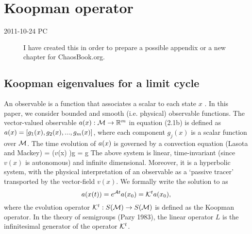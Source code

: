 
\chapter{Koopman operator}
\label{c-Koopman}

\renewcommand{\ssp}{x}
\renewcommand{\vel}{\ensuremath{v}}   %
\newcommand{\Ubf}{{\bf\mathbf{U}}}
\newcommand{\Mbf}{{\bf\mathbf{M}}}
\newcommand{\Ibf}{{\bf\mathbf{I}}}
\newcommand{\fb}{{\bf f}}
\newcommand{\jb}{{\boldsymbol j}}
\newcommand{\df}[2]{\frac{\partial #1}{\partial #2}}


\begin{description}

\item[2011-10-24 PC] I have created this in order to prepare a
possible appendix or a new chapter for  ChaosBook.org.

\end{description}

\section{Koopman eigenvalues for a limit cycle}


An observable is a function that associates a scalar to each state $\ssp$ .
In this paper, we consider bounded and smooth (i.e. physical) observable
functions. The vector-valued observable $\obser(\ssp) : \pS \to \reals^m$ in
equation (2.1b) is defined as $\obser(\ssp) = [g_1(\ssp), g_2(\ssp), . . . , g_m(\ssp)]$,
where each component $g_j(\ssp)$ is a scalar function over ${\cal M}$. The time
evolution of $\obser(\ssp)$ is governed by a convection equation (Lasota and
Mackey)
\beq
{}
= (\vel(\ssp) \cdot \nabla)g = \Aop g
The above system is linear, time-invariant (since $\vel(\ssp)$ is
autonomous) and infinite dimensional. Moreover, it is a hyperbolic
system, with the physical interpretation of an observable as a `passive
tracer' transported by the vector-field $\vel(\ssp)$. We formally write the
solution to  as
\[
\obser(\ssp(\zeit)) = e^{\Aop \zeit}\obser(\xInit) = \Uop^\zeit \obser(\xInit),
\]
where the evolution operator ${\cal K}^t : S({\cal M}) \to S({\cal M})$ is defined as the
Koopman operator. In the theory of semigroups (Pazy 1983),
the linear operator $L$ is the infinitesimal generator of the operator
${\cal K}^t$.

